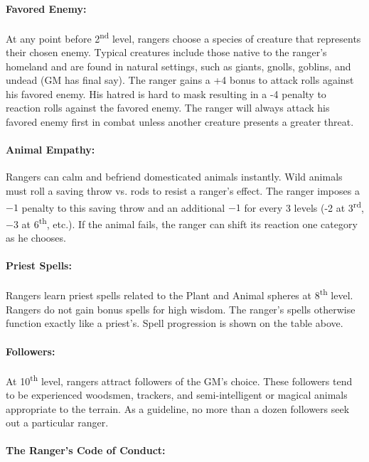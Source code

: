 \begin{multicols}{2}
\paragraph{Favored Enemy:} At any point before 2\textsuperscript{nd} level, rangers choose a species of creature that represents their chosen enemy.  Typical creatures include those native to the ranger's homeland and are found in natural settings, such as giants, gnolls, goblins, and undead (GM has final say).  The ranger gains a +4 bonus to attack rolls against his favored enemy.  His hatred is hard to mask resulting in a -4 penalty to reaction rolls against the favored enemy.  The ranger will always attack his favored enemy first in combat unless another creature presents a greater threat.

\paragraph{Animal Empathy:} Rangers can calm and befriend domesticated animals instantly.  Wild animals must roll a saving throw vs. rods to resist a ranger's effect.  The ranger imposes a $-1$ penalty to this saving throw and an additional $-1$ for every 3 levels (-2 at 3\textsuperscript{rd}, $-3$ at 6\textsuperscript{th}, etc.).  If the animal fails, the ranger can shift its reaction one category as he chooses.  

\paragraph{Priest Spells:} Rangers learn priest spells related to the Plant and Animal spheres at 8\textsuperscript{th} level.  Rangers do not gain bonus spells for high wisdom.  The ranger's spells otherwise function exactly like a priest's.  Spell progression is shown on the table above.

\paragraph{Followers:} At 10\textsuperscript{th} level, rangers attract followers of the GM's choice.  These followers tend to be experienced woodsmen, trackers, and semi-intelligent or magical animals appropriate to the terrain.  As a guideline, no more than a dozen followers seek out a particular ranger.

\paragraph{The Ranger's Code of Conduct:}


\end{multicols}
